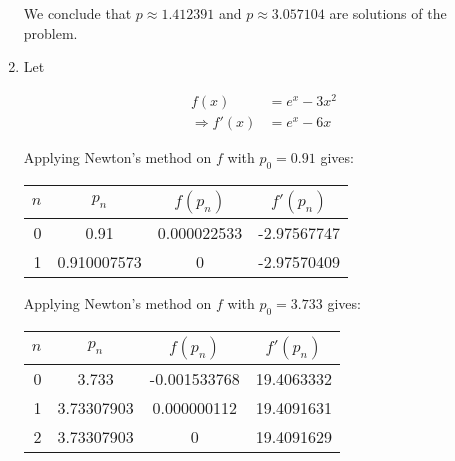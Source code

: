 \documentclass[../../../../Assignments]{subfiles}
\begin{document}
\begin{solution}
\begin{enumerate}[label = \alph*)]
            We conclude that \(p \approx \num{1.412391}\) and \(p \approx
            \num{3.057104}\) are solutions of the problem.

        \item Let

            \begin{align*}
                             f(x) &= e^x - 3x^2 \\
                \Rightarrow f'(x) &= e^x - 6x
            \end{align*}

            Applying Newton's method on \(f\) with \(p_0 = \num{0.91}\) gives:

            \begin{table}[H]
                \centering
                \begin{tabular}{r S[table-format=1.9] S[table-format=1.9] S[table-format=-1.9]}
                    \toprule
                    \(n\)  &   {\(p_n\)}   &  {\(f(p_n)\)}  &  {\(f'(p_n)\)}  \\
                      &  0.91         &   0.000022533  &  -2.97567747    \\
                        1  &  0.910007573  &   0            &  -2.97570409    \\
                    \bottomrule
                \end{tabular}
            \end{table}

            Applying Newton's method on \(f\) with \(p_0 = \num{3.733}\) gives:

            \begin{table}[H]
                \centering
                \begin{tabular}{r S[table-format=1.9] S[table-format=-1.9] S[table-format=2.9]}
                    \toprule
                    \(n\)  &   {\(p_n\)}   &   {\(f(p_n)\)}  &  {\(f'(p_n)\)}  \\
                      &  3.733        &  -0.001533768   &  19.4063332     \\
                        1  &  3.73307903   &   0.000000112   &  19.4091631     \\
                        2  &  3.73307903   &   0             &  19.4091629     \\
                    \bottomrule
                \end{tabular}
            \end{table}


\end{enumerate}
\end{solution}
\end{document}
